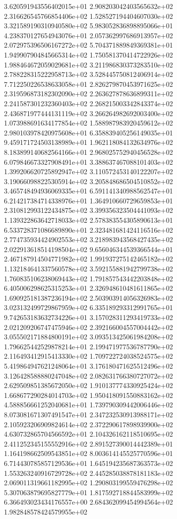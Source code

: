 3.620591943556402015e+01 2.908203042403565632e+02 2.316626545766854406e+02
1.528527194404607030e+02 3.321589190310940580e+02 5.983052836898895066e+01
4.238370127654943076e+01 2.057362997686913957e+02 2.072975396506167272e+02
5.704371889849369381e+01 1.949907904845665314e+02 1.750581370414722926e+02
1.988464672059029681e+02 3.211986830373283510e+02 2.788228315222958713e+02
3.528445750812406914e+02 7.712250226538633058e+01 2.826279870453971625e+02
2.319596873182302090e+02 2.263627878636899311e+02 2.241587301232360403e+02
2.268215003342843374e+02 2.436871977444131119e+02 3.266264982692003400e+02
1.073988691634177854e+02 1.588987983920459612e+02 2.980103978420975608e+01
6.358839405256149035e+01 9.459171724503138989e+01 1.962118084132634976e+02
8.183899140682564166e+01 2.968025752940456528e+02 6.079846673327908491e+01
3.388637467088101403e+02 1.399206620725892947e+02 3.110572453140122207e+02
3.190660988225305914e+02 3.205848686504510852e+02 3.465748494936069335e+01
6.591141340988562547e+01 6.214217384714338976e+01 1.364910660729659853e+01
2.310812993122434875e+02 3.399356323504441093e+02 1.139322863642718033e+02
2.578383554305890613e+01 6.533728371086689890e+01 2.323481681424116516e+02
2.774735934424902553e+02 3.218983943568427435e+02 2.022913618514198504e+02
9.656046344539366544e+01 2.467187914504771982e+02 1.991937275142465182e+02
1.132184641337560578e+02 3.592155881942799738e+02 1.760835106238069443e+02
1.791857543442203848e+02 6.405006298625315253e+01 2.326948610481611865e+02
1.690925181387236194e+02 2.503903914056326983e+02 3.023132499729867959e+02
6.335189293312991765e+01 9.742653183632734226e+01 3.157028311293419733e+02
2.021209206747475946e+02 2.392166004557004442e+02 3.055502171884800191e+02
3.093513425061984208e+02 1.796625442529878214e+01 2.199471977536787790e+02
2.116493412915413330e+02 1.709722724038524575e+02 5.419864947621248064e+01
3.176180471625512496e+02 3.126428588880247048e+02 2.082631766380727072e+02
2.629509851385672050e+02 1.910137774330925424e+02 1.668677290284014703e+02
1.950418091550883162e+02 4.588856661252040681e+01 1.739790309442006446e+02
8.073081671307491547e+01 2.347232530913988171e+02 2.105923206909824614e+02
2.372290617898939900e+02 4.630732865704566592e+01 2.104326162118510695e+02
2.411252345155552916e+02 2.891527390014442389e+01 1.164198662509543851e+02
8.003614145525770596e+01 6.714430785857129536e+01 1.645194235687363573e+02
1.553263240916729728e+02 2.445285038878181183e+02 2.069011319661182995e+02
1.290803199559476298e+02 5.307063879695827779e+01 1.817592718844583999e+02
6.366493023434176557e+00 2.684362099454994564e+02 1.982848578424579955e+02
